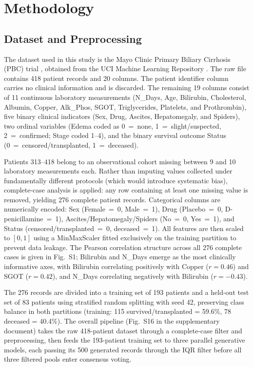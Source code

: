 \documentclass[journal]{IEEEtran}
\begin{document}
\FloatBarrier
\section{Methodology}
\label{sec:methodology}

\subsection{Dataset and Preprocessing}

The dataset used in this study is the Mayo Clinic Primary Biliary Cirrhosis (PBC) trial \cite{fleming1991}, obtained from the UCI Machine Learning Repository \cite{ucipbc}. The raw file contains 418 patient records and 20 columns. The patient identifier column carries no clinical information and is discarded. The remaining 19 columns consist of 11 continuous laboratory measurements (N\_Days, Age, Bilirubin, Cholesterol, Albumin, Copper, Alk\_Phos, SGOT, Triglycerides, Platelets, and Prothrombin), five binary clinical indicators (Sex, Drug, Ascites, Hepatomegaly, and Spiders), two ordinal variables (Edema coded as 0~=~none, 1~=~slight/suspected, 2~=~confirmed; Stage coded 1--4), and the binary survival outcome Status (0~=~censored/transplanted, 1~=~deceased).

Patients 313--418 belong to an observational cohort missing between 9 and 10 laboratory measurements each. Rather than imputing values collected under fundamentally different protocols (which would introduce systematic bias), complete-case analysis is applied: any row containing at least one missing value is removed, yielding 276 complete patient records. Categorical columns are numerically encoded: Sex (Female~=~0, Male~=~1), Drug (Placebo~=~0, D-penicillamine~=~1), Ascites/Hepatomegaly/Spiders (No~=~0, Yes~=~1), and Status (censored/transplanted~=~0, deceased~=~1). All features are then scaled to $[0, 1]$ using a MinMaxScaler fitted exclusively on the training partition to prevent data leakage. The Pearson correlation structure across all 276 complete cases is given in Fig.~S1; Bilirubin and N\_Days emerge as the most clinically informative axes, with Bilirubin correlating positively with Copper ($r = 0.46$) and SGOT ($r = 0.42$), and N\_Days correlating negatively with Bilirubin ($r = -0.43$).

The 276 records are divided into a training set of 193 patients and a held-out test set of 83 patients using stratified random splitting with seed 42, preserving class balance in both partitions (training: 115 survived/transplanted = 59.6\%, 78 deceased = 40.4\%). The overall pipeline (Fig.~S16 in the supplementary document) takes the raw 418-patient dataset through a complete-case filter and preprocessing, then feeds the 193-patient training set to three parallel generative models, each passing its 500 generated records through the IQR filter before all three filtered pools enter consensus voting.
\end{document}
